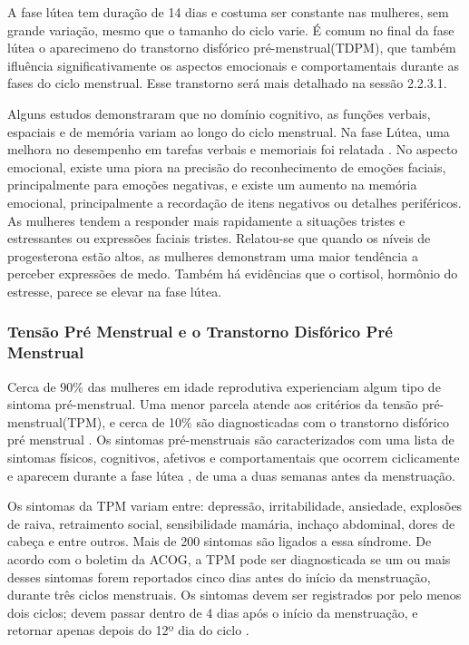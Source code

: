 A fase lútea tem duração de 14 dias e costuma ser constante nas mulheres, 
sem grande variação, mesmo que o tamanho do ciclo varie. É comum no final 
da fase lútea o aparecimeno do transtorno disfórico pré-menstrual(TDPM), 
que também ifluência significativamente os aspectos emocionais e 
comportamentais durante as fases do ciclo menstrual. Esse transtorno 
será mais detalhado na sessão 2.2.3.1.

Alguns estudos demonstraram que no domínio cognitivo, as funções verbais, 
espaciais e de memória variam ao longo do ciclo menstrual. Na fase Lútea, 
uma melhora no desempenho em tarefas verbais e memoriais foi relatada 
\cite{hausmann2000}. No aspecto emocional, existe uma piora na precisão 
do reconhecimento de emoções faciais, principalmente para emoções negativas, 
e existe um aumento na memória emocional, principalmente a recordação de 
itens negativos ou detalhes periféricos. As mulheres tendem a responder 
mais rapidamente a situações tristes e estressantes ou expressões faciais 
tristes. Relatou-se que quando os níveis de progesterona estão altos, as 
mulheres demonstram uma maior tendência a perceber expressões de medo. 
Também há evidências que o cortisol, hormônio do estresse, parece se elevar 
na fase lútea\cite{kirschbaum1999}.

\subsubsection{Tensão Pré Menstrual e o Transtorno Disfórico Pré Menstrual}

Cerca de 90\% das mulheres em idade reprodutiva experienciam algum tipo de 
sintoma pré-menstrual. Uma menor parcela atende aos critérios da tensão 
pré-menstrual(TPM), e cerca de 10\% são diagnosticadas com o transtorno 
disfórico pré menstrual \cite{mishell2005}. Os sintomas pré-menstruais 
são caracterizados com uma lista de sintomas físicos, cognitivos, 
afetivos e comportamentais que ocorrem ciclicamente e aparecem durante a 
fase lútea \cite{obrien2011}, de uma a duas semanas antes da menstruação. 

Os sintomas da TPM variam entre: depressão, irritabilidade, ansiedade, 
explosões de raiva, retraimento social, sensibilidade mamária, 
inchaço abdominal, dores de cabeça e entre outros. Mais de 200 sintomas 
são ligados a essa síndrome. De acordo com o boletim da ACOG, a TPM pode 
ser diagnosticada se um ou mais desses sintomas forem reportados cinco dias 
antes do início da menstruação, durante três ciclos menstruais. Os sintomas 
devem ser registrados por pelo menos dois ciclos; devem passar dentro de 
4 dias após o início da menstruação, e retornar apenas depois do 12º dia do 
ciclo \cite{ACOG2000}.

